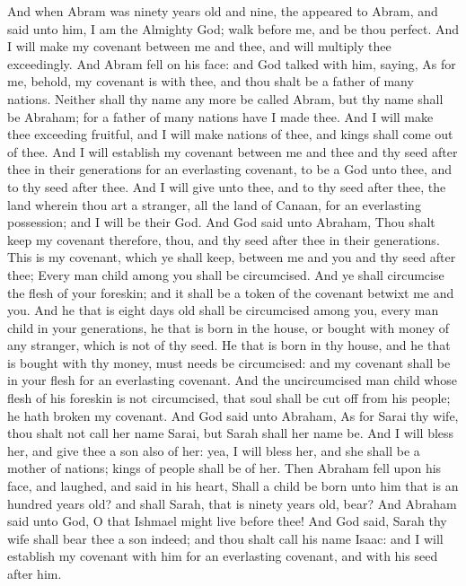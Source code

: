 \begin{biblechapter} %
 And when Abram was ninety years old and nine, the \LORD appeared to Abram, and said unto him, I am the Almighty God; walk before me, and be thou perfect.
\verse And I will make my covenant between me and thee, and will multiply thee exceedingly.
\verse And Abram fell on his face: and God talked with him, saying,
\verse As for me, behold, my covenant is with thee, and thou shalt be a father of many nations.
\verse Neither shall thy name any more be called Abram, but thy name shall be Abraham; for a father of many nations have I made thee.
\verse And I will make thee exceeding fruitful, and I will make nations of thee, and kings shall come out of thee.
\verse And I will establish my covenant between me and thee and thy seed after thee in their generations for an everlasting covenant, to be a God unto thee, and to thy seed after thee.
\verse And I will give unto thee, and to thy seed after thee, the land wherein thou art a stranger, all the land of Canaan, for an everlasting possession; and I will be their God.
\verse And God said unto Abraham, Thou shalt keep my covenant therefore, thou, and thy seed after thee in their generations.
\verse This is my covenant, which ye shall keep, between me and you and thy seed after thee; Every man child among you shall be circumcised.
\verse And ye shall circumcise the flesh of your foreskin; and it shall be a token of the covenant betwixt me and you.
\verse And he that is eight days old shall be circumcised among you, every man child in your generations, he that is born in the house, or bought with money of any stranger, which is not of thy seed.
\verse He that is born in thy house, and he that is bought with thy money, must needs be circumcised: and my covenant shall be in your flesh for an everlasting covenant.
\verse And the uncircumcised man child whose flesh of his foreskin is not circumcised, that soul shall be cut off from his people; he hath broken my covenant.
\verse And God said unto Abraham, As for Sarai thy wife, thou shalt not call her name Sarai, but Sarah shall her name be.
\verse And I will bless her, and give thee a son also of her: yea, I will bless her, and she shall be a mother of nations; kings of people shall be of her.
\verse Then Abraham fell upon his face, and laughed, and said in his heart, Shall a child be born unto him that is an hundred years old? and shall Sarah, that is ninety years old, bear?
\verse And Abraham said unto God, O that Ishmael might live before thee!
\verse And God said, Sarah thy wife shall bear thee a son indeed; and thou shalt call his name Isaac: and I will establish my covenant with him for an everlasting covenant, and with his seed after him.

\end{biblechapter}

